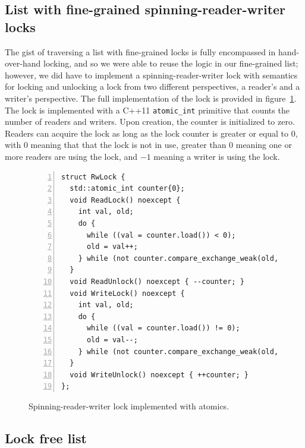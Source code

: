 \documentclass[11pt]{article}
\begin{document}
\subsection{List with fine-grained spinning-reader-writer locks}
The gist of traversing a list with fine-grained locks is fully encompassed in
hand-over-hand locking, and so we were able to reuse the logic in our
fine-grained list; however, we did have to implement a spinning-reader-writer
lock with semantics for locking and unlocking a lock from two different
perspectives, a reader's and a writer's perspective. The full implementation of
the lock is provided in figure~\ref{fig:rwlock}. The lock is implemented with a
C++11 {\tt atomic\_int} primitive that counts the number of readers and writers.
Upon creation, the counter is initialized to zero. Readers can acquire the lock
as long as the lock counter is greater or equal to $0$, with $0$ meaning that
that the lock is not in use, greater than $0$ meaning one or more readers are
using the lock, and $-1$ meaning a writer is using the lock.

\begin{figure}[h]
\begin{center}
\begin{lstlisting}[numbers=left]
struct RwLock {
  std::atomic_int counter{0};
  void ReadLock() noexcept {
    int val, old;
    do {
      while ((val = counter.load()) < 0);
      old = val++;
    } while (not counter.compare_exchange_weak(old, val));
  }
  void ReadUnlock() noexcept { --counter; }
  void WriteLock() noexcept {
    int val, old;
    do {
      while ((val = counter.load()) != 0);
      old = val--;
    } while (not counter.compare_exchange_weak(old, val));
  }
  void WriteUnlock() noexcept { ++counter; }
};
\end{lstlisting}
\caption{Spinning-reader-writer lock implemented with atomics.}
\label{fig:rwlock}
\end{center}
\end{figure}

\subsection{Lock free list}
\end{document}
